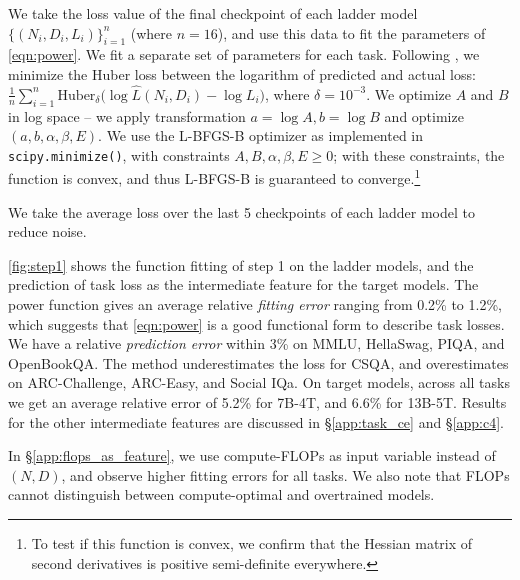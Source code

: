 We take the loss value of the final checkpoint of each ladder model $\{ (N_i, D_i, L_i) \}_{i=1}^{n}$ (where $n = 16$), and use this data to fit the parameters of \autoref{eqn:power}.
We fit a separate set of parameters for each task.
Following \citet{Hoffmann2022TrainingCL},
we minimize the Huber loss between the logarithm of predicted and actual loss: $\frac{1}{n} \sum_{i=1}^{n} \text{Huber}_\delta \big( \log \hat{L}(N_i, D_i) - \log L_i \big)$, where $\delta = 10^{-3}$.
We optimize $A$ and $B$ in log space -- we apply transformation $a = \log A, b = \log B$ and optimize $(a, b, \alpha, \beta, E)$.
We use the L-BFGS-B optimizer as implemented in \texttt{scipy.minimize()}, with constraints $A, B, \alpha, \beta, E \geq 0$; with these constraints, the function is convex, and thus L-BFGS-B is guaranteed to converge.\footnote{To test if this function is convex, we confirm that the Hessian matrix of second derivatives is positive semi-definite everywhere.} 

We take the average loss over the last 5 checkpoints of each ladder model to reduce noise. 



\autoref{fig:step1} shows the function fitting of step 1 on the ladder models, and the prediction of task loss as the intermediate feature for the target models. The power function gives an average relative \textit{fitting error} ranging from 0.2\% to 1.2\%, which suggests that \autoref{eqn:power} is a good functional form to describe task losses.
We have a relative \textit{prediction error} within 3\% on MMLU, HellaSwag, PIQA, and OpenBookQA.
The method underestimates the loss for CSQA, and overestimates on ARC-Challenge, ARC-Easy, and Social IQa.
On target models, across all tasks we get an average relative error of 5.2\% for 7B-4T, and 6.6\% for 13B-5T.
Results for the other intermediate features are discussed in \S\ref{app:task_ce} and \S\ref{app:c4}.

In \S\ref{app:flops_as_feature}, we use compute-FLOPs as input variable instead of $(N, D)$, and observe higher fitting errors for all tasks. We also note that FLOPs cannot distinguish between compute-optimal and overtrained models.

